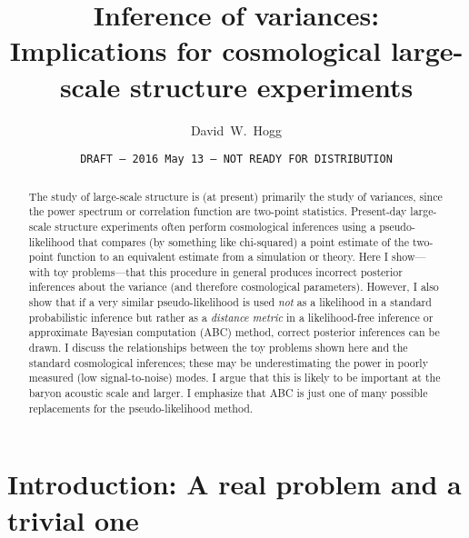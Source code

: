 \documentclass[12pt, letterpaper, preprint]{aastex}
\begin{document}
\sloppy\sloppypar\frenchspacing %

\title{Inference of variances:\\
       Implications for cosmological large-scale structure experiments}
\date{\texttt{DRAFT --- 2016 May 13 --- NOT READY FOR DISTRIBUTION}}
\author{
  David~W.~Hogg
}

\begin{abstract}
The study of large-scale structure is (at present) primarily the study
of variances, since the power spectrum or correlation function are
two-point statistics.
Present-day large-scale structure experiments often perform
cosmological inferences using a pseudo-likelihood that compares
(by something like chi-squared) a
point estimate of the two-point function to an equivalent estimate
from a simulation or theory.
Here I show---with toy problems---that this procedure in general
produces incorrect posterior inferences about the variance (and
therefore cosmological parameters).
However, I also show that if a very similar pseudo-likelihood
is used
\emph{not} as a likelihood in a standard probabilistic inference but
rather as a \emph{distance metric} in a likelihood-free inference or
approximate Bayesian
computation (ABC) method, correct posterior inferences can be drawn.
I discuss the relationships between the toy problems shown here and
the standard cosmological inferences; these may be underestimating
the power in poorly measured (low signal-to-noise) modes.
I argue that this is likely to be important at the baryon acoustic
scale and larger.
I emphasize that ABC is just one of many possible replacements for
the pseudo-likelihood method.
\end{abstract}


\section{Introduction: A real problem and a trivial one}
\end{document}
